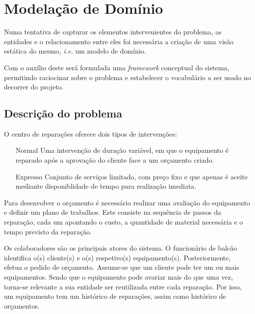 \documentclass[a4paper,12pt]{scrreprt}
\begin{document}
\chapter{Modelação de Domínio} \label{modelacao_dominio}
Numa tentativa de capturar os elementos intervenientes do problema, as entidades e o relacionamento entre eles foi necessária
a criação de uma visão estática do mesmo, \textit{i.e.} um modelo de domínio. 

Com o auxílio deste será formulada uma \textit{framework} conceptual do sistema, permitindo raciocinar sobre o problema e estabelecer o 
vocabulário a ser usado no decorrer do projeto.

\section{Descrição do problema}
O centro de reparações oferece dois tipos de intervenções:
\begin{itemize}
    \item[Normal]{Uma intervenção de duração variável, em que o equipamento é reparado após a aprovação do cliente face a um orçamento criado.}
    \item[Expresso]{Conjunto de serviços limitado, com preço fixo e 
                    que apenas é aceite mediante disponiblidade de tempo para realização imediata.
                   }
\end{itemize}

Para desenvolver o orçamento é necessário realizar uma avaliação do equipamento e definir um plano de trabalhos. 
Este consiste na sequência de passos da reparação, cada um apontando o custo, a quantidade de material necessária e o tempo 
previsto da reparação.

Os colaboradores são os principais atores do sistema. 
O funcionário de balcão identifica o(s) cliente(s) e o(s) respetivo(s) equipamento(s). Posteriormente, efetua o pedido de orçamento.
Assume-se que um cliente pode ter um ou mais equipamentos.
Sendo que o equipamento pode avariar mais do que uma vez, torna-se relevante a sua entidade ser reutilizada entre cada reparação.
Por isso, um equipamento tem um histórico de reparações, assim como histórico de orçamentos.
\end{document}
